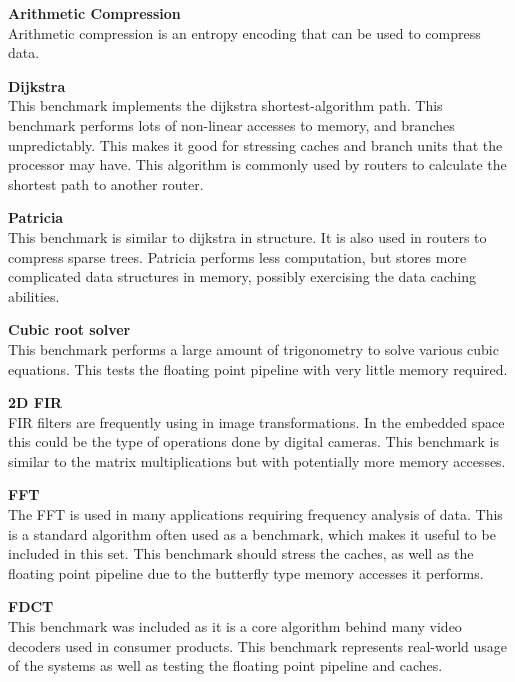 \documentclass[twocolumn]{article}
\begin{document}
\vspace{3mm}
\textbf{Arithmetic Compression}\\
Arithmetic compression is an entropy encoding that can be used to compress data.

\vspace{3mm}
\textbf{Dijkstra}\\
This benchmark implements the dijkstra shortest-algorithm path. This benchmark performs lots of non-linear accesses to memory, and branches unpredictably. This makes it good for stressing caches and branch units that the processor may have. This algorithm is commonly used by routers to calculate the shortest path to another router.

\vspace{3mm}
\textbf{Patricia}\\
This benchmark is similar to dijkstra in structure. It is also used in routers to compress sparse trees. Patricia performs less computation, but stores more complicated data structures in memory, possibly exercising the data caching abilities.

\vspace{3mm}
\textbf{Cubic root solver}\\
This benchmark performs a large amount of trigonometry to solve various cubic equations. This tests the floating point pipeline with very little memory required.

\vspace{3mm}
\textbf{2D FIR}\\
FIR filters are frequently using in image transformations. In the embedded space this could be the type of operations done by digital cameras. This benchmark is similar to the matrix multiplications but with potentially more memory accesses.

\vspace{3mm}
\textbf{FFT}\\
The FFT is used in many applications requiring frequency analysis of data. This is a standard algorithm often used as a benchmark, which makes it useful to be included in this set. This benchmark should stress the caches, as well as the floating point pipeline due to the butterfly type memory accesses it performs.

\vspace{3mm}
\textbf{FDCT}\\
This benchmark was included as it is a core algorithm behind many video decoders used in consumer products. This benchmark represents real-world usage of the systems as well as testing the floating point pipeline and caches.
\end{document}
